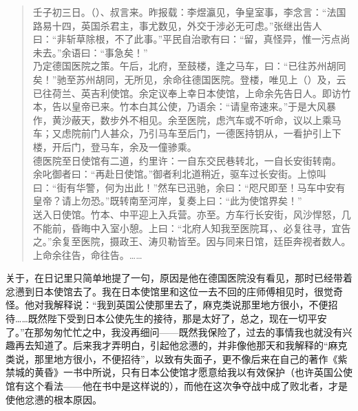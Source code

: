 \begin{quote}
	壬子初三日。（）、叔言来。昨报载：李煜瀛见，争皇室事，李念言：“法国路易十四，英国杀君主，事尤数见，外交于涉必无可虑。”张继出告人曰：“非斩草除根，不了此事。”平民自治歌有曰：“留，真怪异，惟一污点尚未去。”余语曰：“事急矣！”\\

乃定德国医院之策。午后，北府，至鼓楼，逢之马车，曰：“已往苏州胡同矣！”驰至苏州胡同，无所见，余命往德国医院。登楼，唯见上（）及，云已往荷兰、英吉利使馆。余定议奉上幸日本使馆，上命余先告日人。即访竹本，告以皇帝已来。竹本白其公使，乃语余：“请皇帝速来。”于是大风暴作，黄沙蔽天，数步外不相见。余至医院，虑汽车或不听命，议以上乘马车；又虑院前门人甚众，乃引马车至后门，一德医持钥从，一看护引上下楼，开后门，登马车，余及一僮骖乘。\\

德医院至日使馆有二道，约里许：一自东交民巷转北，一自长安街转南。\\

余叱御者曰：“再赴日使馆。”御者利北道稍近，驱车过长安街。上惊叫曰：“街有华警，何为出此！”然车已迅驰，余曰：“咫尺即至！马车中安有皇帝？请上勿恐。”既转南至河岸，复奏上曰：“此为使馆界矣！”\\

送入日使馆。竹本、中平迎上入兵营。亦至。方车行长安街，风沙悍怒，几不能前，昏晦中入室小憩。上曰：“北府人知我至医院耳，、必复往寻，宜告之。”余复至医院，摄政王、涛贝勒皆至。因与同来日馆，廷臣奔视者数人。上命余往告，命往告。……\\
\end{quote}

关于，在日记里只简单地提了一句，原因是他在德国医院没有看见，那时已经带着忿懑到日本使馆去了。我在日本使馆里和这位一去不回的庄师傅相见时，很觉奇怪。他对我解释说：“我到英国公使那里去了，麻克类说那里地方很小，不便招待……既然陛下受到日本公使先生的接待，那是太好了，总之，现在一切平安了。”在那匆匆忙忙之中，我没再细问——既然我保险了，过去的事情我也就没有兴趣再去知道了。后来我才弄明白，引起他忿懑的，并非像他那天和我解释的“麻克类说，那里地方很小，不便招待”，以致有失面子，更不像后来在自己的著作《紫禁城的黄昏》一书中所说，只有日本公使馆才愿意给我以有效保护（也许英国公使馆有这个看法——他在书中是这样说的），而他在这次争夺战中成了败北者，才是使他忿懑的根本原因。\\

